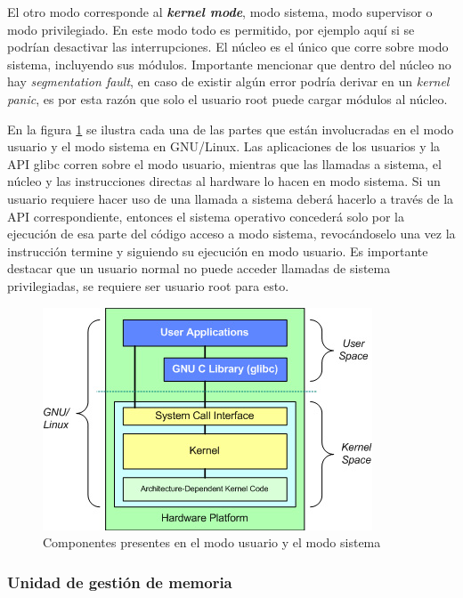 El otro modo corresponde al \textbf{\textit{kernel mode}}, modo sistema, modo
supervisor o modo privilegiado. En este modo todo es permitido, por ejemplo aquí
si se podrían desactivar las interrupciones. El núcleo es el único que corre
sobre modo sistema, incluyendo sus módulos. Importante mencionar que dentro del
núcleo no hay \textit{segmentation fault}, en caso de existir algún error podría
derivar en un \textit{kernel panic}, es por esta razón que solo el usuario root
puede cargar módulos al núcleo.

En la figura \ref{modo_dual} se ilustra cada una de las partes que están
involucradas en el modo usuario y el modo sistema en GNU/Linux. Las aplicaciones
de los usuarios y la API glibc corren sobre el modo usuario, mientras que las
llamadas a sistema, el núcleo y las instrucciones directas al hardware lo hacen
en modo sistema. Si un usuario requiere hacer uso de una llamada a sistema
deberá hacerlo a través de la API correspondiente, entonces el sistema operativo
concederá solo por la ejecución de esa parte del código acceso a modo sistema,
revocándoselo una vez la instrucción termine y siguiendo su ejecución en modo
usuario. Es importante destacar que un usuario normal no puede acceder
llamadas de sistema privilegiadas, se requiere ser usuario root para esto.

\begin{figure}[htbp]
\begin{center}
	\includegraphics[scale=1.0]{img/C03_estructura/modo_dual}
	\caption{Componentes presentes en el modo usuario y el modo sistema}
	\label{modo_dual}
\end{center}
\end{figure}

\subsubsection{Unidad de gestión de memoria}

